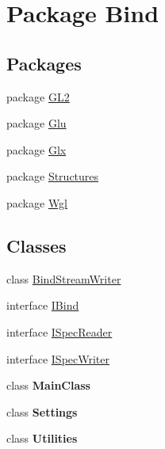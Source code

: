 \hypertarget{namespace_bind}{
\section{Package Bind}
\label{namespace_bind}
}
\subsection*{Packages}
\begin{DoxyCompactItemize}
\item 
package \hyperlink{namespace_bind_1_1_g_l2}{GL2}
\item 
package \hyperlink{namespace_bind_1_1_glu}{Glu}
\item 
package \hyperlink{namespace_bind_1_1_glx}{Glx}
\item 
package \hyperlink{namespace_bind_1_1_structures}{Structures}
\item 
package \hyperlink{namespace_bind_1_1_wgl}{Wgl}
\end{DoxyCompactItemize}
\subsection*{Classes}
\begin{DoxyCompactItemize}
\item 
class \hyperlink{class_bind_1_1_bind_stream_writer}{BindStreamWriter}
\item 
interface \hyperlink{interface_bind_1_1_i_bind}{IBind}
\item 
interface \hyperlink{interface_bind_1_1_i_spec_reader}{ISpecReader}
\item 
interface \hyperlink{interface_bind_1_1_i_spec_writer}{ISpecWriter}
\item 
class {\bfseries MainClass}
\item 
class {\bfseries Settings}
\item 
class {\bfseries Utilities}
\end{DoxyCompactItemize}
